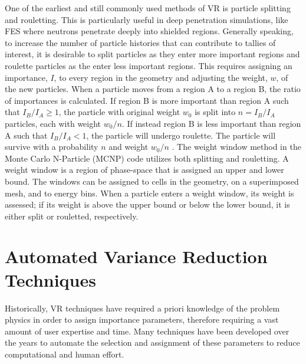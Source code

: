 One of the earliest and still commonly used methods of VR is particle splitting
and rouletting.  This is particularly useful in deep penetration simulations,
like FES where neutrons penetrate deeply into shielded regions.  
Generally speaking, to increase the number of particle
histories that can contribute to tallies of interest, it is desirable to split
particles as they enter more important regions and roulette particles as the
enter less important regions. 
This requires assigning an importance, $I$, to every
region in the geometry and adjusting the weight, $w$, of the new particles. 
When a particle moves from a region A to a region B,
the ratio of importances is calculated.  If region B is more important than
region A such that 
$I_{B}/I_{A} \geqslant 1$, 
the particle with original weight $w_{0}$ is split into 
$n = I_{B}/I_{A}$
particles, each with weight $w_{0}/n$.  If instead region B is less important
than region A such that
$I_{B}/I_{A} < 1$, 
the particle will undergo roulette. 
The particle will survive with a probability $n$ and weight $w_{0}/n$
\cite{Carter_Cashwell_1975}.
The weight window method in the Monte Carlo N-Particle (MCNP) code utilizes both splitting and
rouletting.  A weight window is a region of phase-space that is assigned an upper and
lower bound.  The windows can be assigned to cells in the geometry, on a
superimposed mesh, and to energy bins.  When a particle enters a weight window, its weight is assessed; if
its weight is above the upper bound or below the lower bound, it is either split
or rouletted, respectively.


\section{Automated Variance Reduction Techniques}\label{sec:auto_vr}

Historically, VR techniques have required a priori knowledge of the problem physics
in order to assign importance parameters, therefore requiring a vast amount of
user expertise and time.
Many techniques have been developed over the years to automate the selection and
assignment of these parameters to reduce computational and human effort.

